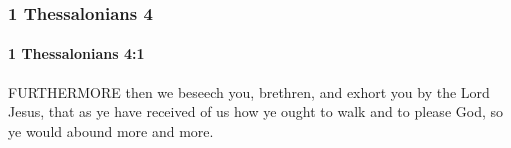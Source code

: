 			\begin{framed}
			\scriptsize
				\begin{compactdesc}
					\item[SBLG] 
				\end{compactdesc}
			\end{framed}

	\subsubsection{1 Thessalonians 4} %
		\label{1THESSALONIANS-4}
		
		\paragraph{1 Thessalonians 4:1} %
			\label{1THESSALONIANS-4-1}

			FURTHERMORE then we beseech you, brethren, and exhort you by the Lord Jesus, that as ye have received of us how ye ought to walk and to please God, so ye would abound more and more.

